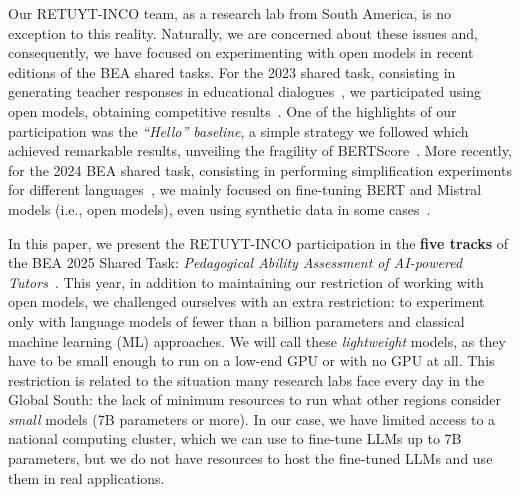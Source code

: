 \documentclass[11pt]{article}
\begin{document}
Our RETUYT-INCO team, as a research lab from South America, is no exception to this reality.
Naturally, we are concerned about these issues and, consequently, we have focused on experimenting with open models in recent editions of the BEA shared tasks. 
For the 2023 shared task, consisting in generating teacher responses in educational dialogues~\citep{tack-etal-2023-bea}, we participated using open models, obtaining competitive results~\citep{baladon-etal-2023-retuyt}. One of the highlights of our participation was the \textit{``Hello'' baseline}, a simple strategy we followed which achieved remarkable results, unveiling the fragility of BERTScore~\citep{Zhang*2020BERTScore}. 
More recently, for the 2024 BEA shared task, consisting in performing simplification experiments for different languages~\citep{shardlow-etal-2024-bea}, we mainly focused on fine-tuning BERT and Mistral models (i.e., open models), even using synthetic data in some cases~\citep{sastre-etal-2024-retuyt}.



In this paper, we present the RETUYT-INCO participation in the\textbf{ five tracks} of the BEA 2025 Shared Task: \textit{Pedagogical Ability Assessment of AI-powered Tutors}~\cite{kochmar2025bea}.
This year, in addition to maintaining our restriction of working with open models, we challenged ourselves with an extra restriction: to experiment only with language models of fewer than a billion parameters and classical machine learning (ML) approaches.
We will call these \textit{lightweight} models, as they have to be small enough to run on a low-end GPU or with no GPU at all. 
This restriction is related to the situation many research labs face every day in the Global South: the lack of minimum resources to run what other regions consider \textit{small} models (7B parameters or more).
In our case, we have limited access to a national computing cluster, which we can use to fine-tune LLMs up to 7B parameters, but we do not have resources to host the fine-tuned LLMs and use them in real applications.
\end{document}
